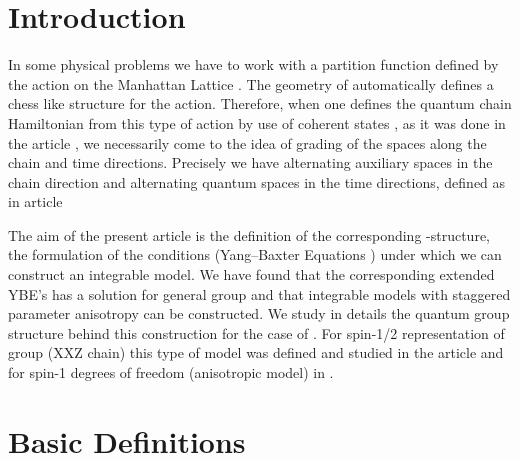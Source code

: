 \documentclass[a4paper,a4paper]{article}
\def\ZZ{{\mathbb Z}}
\begin{document}
\section{Introduction}
\setcounter{equation}{0}

\indent

In some physical problems \cite{S1,CC} we have to work with a 
partition function defined by the action on the Manhattan Lattice
\coordHE{}. The geometry of \coordHE{} automatically defines a chess like 
structure for the action. Therefore, when one defines the 
quantum chain Hamiltonian from this type of action by use of coherent
states \cite{F}, as it was done in the article \cite{S1}, we 
necessarily come to the idea of \myHighlight{$\ZZ_2$}\coordHE{} grading of the spaces
along the chain and time directions. Precisely we have 
alternating auxiliary spaces in the chain direction  and 
alternating quantum spaces
in the time directions, defined as in article \cite{APSS}

The aim of the present article is the definition of the
corresponding \myHighlight{$\ZZ_2$}\coordHE{}-structure, the formulation of the conditions
(Yang--Baxter Equations \coordHE{}) under which we can construct
an integrable model. We have found that the corresponding 
extended 
YBE's has a solution
for general \coordHE{} group and that integrable models
with  staggered parameter anisotropy can be constructed.
We study in details the quantum group structure
behind this construction for the case of \coordHE{}. 
For spin-1/2 representation of \coordHE{} group (XXZ chain)
this type of model 
was defined and studied in the article \cite{APSS} and for
spin-1 degrees of freedom (anisotropic \coordHE{}
model) in \cite{ASSS}.

\section{Basic Definitions}
\setcounter{equation}{0}

\indent
\end{document}
